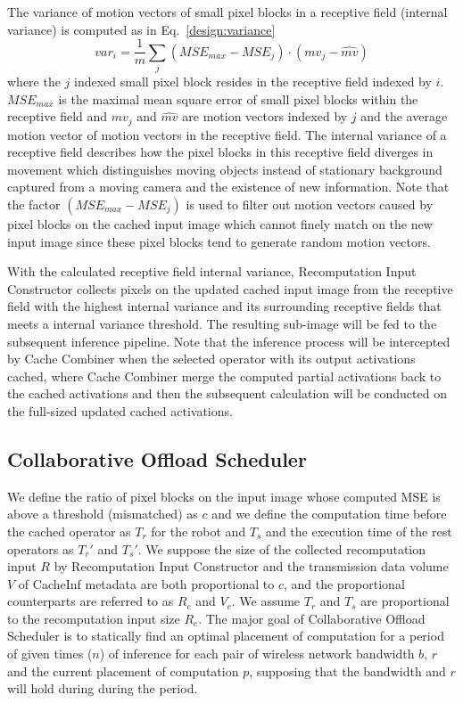 The variance of motion vectors of small pixel blocks in a receptive field (internal variance) is computed as in Eq.~\ref{design:variance}
\begin{equation}
    var_i = \frac{1}{m}\sum_j (MSE_{max} -MSE_j)\cdot (mv_j - \hat{mv})
    \label{design:variance}
\end{equation}
where the $j$ indexed small pixel block resides in the receptive field indexed by $i$. 
$MSE_{max}$ is the maximal mean square error of small pixel blocks within the receptive field and $mv_j$ and $\hat{mv}$ are motion vectors indexed by $j$ and the average motion vector of motion vectors in the receptive field.
The internal variance of a receptive field describes how the pixel blocks in this receptive field diverges in movement which distinguishes moving objects instead of stationary background captured from a moving camera and the existence of new information.
Note that the factor $(MSE_{max} -MSE_j)$ is used to filter out motion vectors caused by pixel blocks on the cached input image which cannot finely match on the new input image since these pixel blocks tend to generate random motion vectors.

With the calculated receptive field internal variance, Recomputation Input Constructor collects pixels on the updated cached input image from the receptive field with the highest internal variance and its surrounding receptive fields that meets a internal variance threshold.
The resulting sub-image will be fed to the subsequent inference pipeline.
Note that the inference process will be intercepted by Cache Combiner when the selected operator with its output activations cached, where Cache Combiner merge the computed partial activations back to the cached activations and then the subsequent calculation will be conducted on the full-sized updated cached activations.



\subsection{Collaborative Offload Scheduler}
We define the ratio of pixel blocks on the input image whose computed MSE is above a threshold (mismatched) as $c$ and we define the computation time before the cached operator as $T_r$ for the robot and $T_s$ and the execution time of the rest operators as $T_r'$ and $T_s'$. 
We suppose the size of the collected recomputation input $R$ by Recomputation Input Constructor and the transmission data volume $V$ of CacheInf metadata are both proportional to $c$, and the proportional counterparts are referred to as $R_c$ and $V_c$.
We assume $T_r$ and $T_s$ are proportional to the recomputation input size $R_c$.
The major goal of Collaborative Offload Scheduler is to statically find an optimal placement of computation for a period of given times ($n$) of inference for each pair of wireless network bandwidth $b$, $r$ and the current placement of computation $p$, supposing that the bandwidth and $r$ will hold during during the period.

